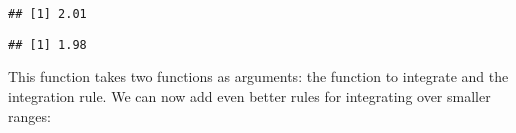 \begin{Shaded}
\begin{Highlighting}[]
\StringTok{ } 
\StringTok{ }\OperatorTok{+}\StringTok{ }\NormalTok{)}

\StringTok{ }
   
\StringTok{ }\OperatorTok{+}\StringTok{ }\NormalTok{(f, points[i], points[i }\OperatorTok{+}\StringTok{ }\NormalTok{])}
\NormalTok{  \}}

\NormalTok{\}}

 \NormalTok{, }
\end{Highlighting}
\end{Shaded}

\begin{verbatim}
## [1] 2.01
\end{verbatim}

\begin{Shaded}
\begin{Highlighting}[]
 \NormalTok{, }
\end{Highlighting}
\end{Shaded}

\begin{verbatim}
## [1] 1.98
\end{verbatim}

This function takes two functions as arguments: the function to
integrate and the integration rule. We can now add even better rules for
integrating over smaller ranges:

